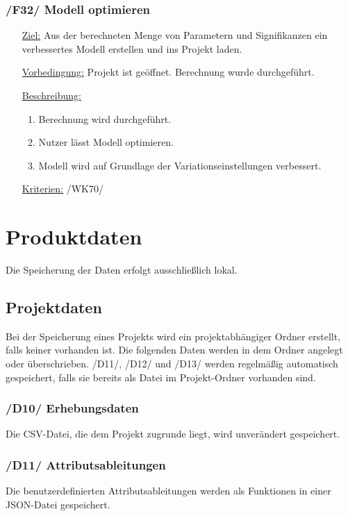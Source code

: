 \documentclass{article}
\begin{document}
\subsubsection*{\textbf{/F32/} Modell optimieren} 
\label{sec:f:Modell optimieren}
\begin{itemize}
    \item[\underline{Ziel:}] Aus der berechneten Menge von Parametern und Signifikanzen ein verbessertes Modell erstellen und ins Projekt laden.
    \item[\underline{Vorbedingung:}] Projekt ist geöffnet. Berechnung wurde durchgeführt.
    \item[\underline{Beschreibung:}]
    \begin{enumerate}
        \item Berechnung wird durchgeführt.
        \item Nutzer lässt Modell optimieren.
        \item Modell wird auf Grundlage der Variationseinstellungen verbessert.
    \end{enumerate}
    \item[\underline{Kriterien:}] /WK70/
\end{itemize}


\clearpage
\section{Produktdaten}
Die Speicherung der Daten erfolgt ausschließlich lokal.
\subsection{Projektdaten}
Bei der Speicherung eines Projekts wird ein projektabhängiger Ordner erstellt, falls keiner vorhanden ist. Die folgenden Daten werden in dem Ordner angelegt oder überschrieben. \newline
/D11/, /D12/ und /D13/ werden regelmäßig automatisch gespeichert, falls sie bereits als Datei im Projekt-Ordner vorhanden sind.
\subsubsection*{\textbf{/D10/} Erhebungsdaten} \label{sec:dd:Erhebungsdaten}
Die CSV-Datei, die dem Projekt zugrunde liegt, wird unverändert gespeichert.
\subsubsection*{\textbf{/D11/} Attributsableitungen} \label{sec:dd:Attributsableitungen}
Die benutzerdefinierten Attributsableitungen werden als Funktionen in einer JSON-Datei gespeichert.
\end{document}
